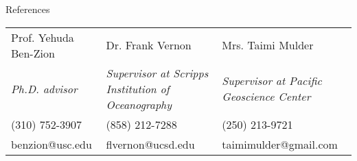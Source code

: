 \begin{rSection}{References}
    \begin{tabu}{X[l] X[l] X[l]}
		Prof. Yehuda Ben-Zion & Dr. Frank Vernon & Mrs. Taimi Mulder\\
		\textit{Ph.D. advisor}
			& \textit{Supervisor at Scripps Institution of Oceanography} 
			& \textit{Supervisor at Pacific Geoscience Center}\\
		(310) 752-3907 
			& (858) 212-7288 
			& (250) 213-9721 \\
		benzion@usc.edu 
			& flvernon@ucsd.edu 
			& taimimulder@gmail.com\\
	\end{tabu}
\end{rSection}